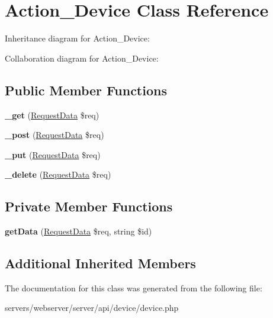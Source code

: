 \hypertarget{class_lora_1_1_api_1_1_action___device}{}\section{Action\+\_\+\+Device Class Reference}
\label{class_lora_1_1_api_1_1_action___device}


Inheritance diagram for Action\+\_\+\+Device\+:


Collaboration diagram for Action\+\_\+\+Device\+:
\subsection*{Public Member Functions}
\begin{DoxyCompactItemize}
\item 
\mbox{\label{class_lora_1_1_api_1_1_action___device_a3ad4bf1b146a3180b34d1327ff2abf69}} 
{\bfseries \+\_\+get} (\hyperlink{class_request_data}{Request\+Data} \$req)
\item 
\mbox{\label{class_lora_1_1_api_1_1_action___device_a50751d47a139282d1c3b08cab1b6562e}} 
{\bfseries \+\_\+post} (\hyperlink{class_request_data}{Request\+Data} \$req)
\item 
\mbox{\label{class_lora_1_1_api_1_1_action___device_a2affcc8f31c13147c33450193b229194}} 
{\bfseries \+\_\+put} (\hyperlink{class_request_data}{Request\+Data} \$req)
\item 
\mbox{\label{class_lora_1_1_api_1_1_action___device_ab8ddc6de1e04524212f7d55893f78864}} 
{\bfseries \+\_\+delete} (\hyperlink{class_request_data}{Request\+Data} \$req)
\end{DoxyCompactItemize}
\subsection*{Private Member Functions}
\begin{DoxyCompactItemize}
\item 
\mbox{\label{class_lora_1_1_api_1_1_action___device_aaed57abc90b47df34b294e5e49ef63ae}} 
{\bfseries get\+Data} (\hyperlink{class_request_data}{Request\+Data} \$req, string \$id)
\end{DoxyCompactItemize}
\subsection*{Additional Inherited Members}


The documentation for this class was generated from the following file\+:\begin{DoxyCompactItemize}
\item 
servers/webserver/server/api/device/device.\+php\end{DoxyCompactItemize}
